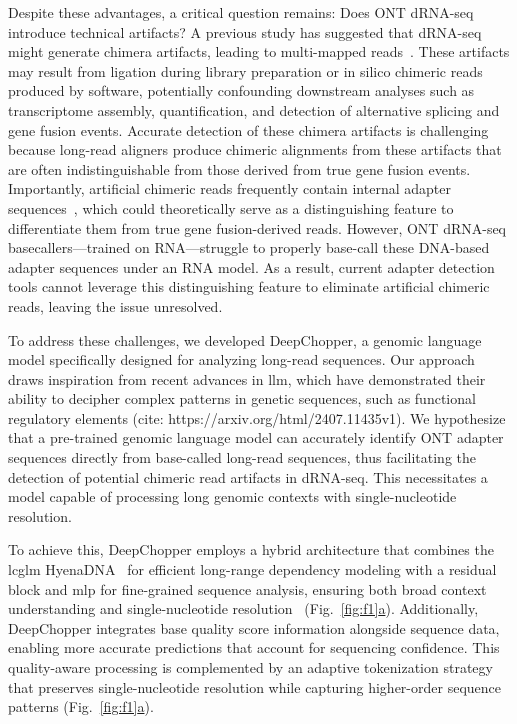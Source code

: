\documentclass[pdflatex,sn-nature, lineno]{sn-jnl}%
\newcommand{\figref}[2]{Fig.~\hyperref[#1]{\ref*{#1}#2}}
\theoremstyle{thmstyleone}%
\theoremstyle{thmstyletwo}%
\theoremstyle{thmstylethree}%
\begin{document}
Despite these advantages, a critical question remains: Does ONT dRNA-seq introduce technical artifacts? A previous study has suggested that dRNA-seq might generate chimera artifacts, leading to multi-mapped reads~\cite{smith2020molecular}. These artifacts may result from ligation during library preparation or in silico chimeric reads produced by software, potentially confounding downstream analyses such as transcriptome assembly, quantification, and detection of alternative splicing and gene fusion events. Accurate detection of these chimera artifacts is challenging because long-read aligners produce chimeric alignments from these artifacts that are often indistinguishable from those derived from true gene fusion events. Importantly, artificial chimeric reads frequently contain internal adapter sequences~\cite{smith2020molecular}, which could theoretically serve as a distinguishing feature to differentiate them from true gene fusion-derived reads. However, ONT dRNA-seq basecallers—trained on RNA—struggle to properly base-call these DNA-based adapter sequences under an RNA model. As a result, current adapter detection tools cannot leverage this distinguishing feature to eliminate artificial chimeric reads, leaving the issue unresolved.

To address these challenges, we developed DeepChopper, a genomic language model specifically designed for analyzing long-read sequences. Our approach draws inspiration from recent advances in \gls{llm}, which have demonstrated their ability to decipher complex patterns in genetic sequences, such as functional regulatory elements (cite: https://arxiv.org/html/2407.11435v1). We hypothesize that a pre-trained genomic language model can accurately identify ONT adapter sequences directly from base-called long-read sequences, thus facilitating the detection of potential chimeric read artifacts in dRNA-seq. This necessitates a model capable of processing long genomic contexts with single-nucleotide resolution.

To achieve this, DeepChopper employs a hybrid architecture that combines the \gls{lcglm} HyenaDNA~\cite{nguyen2024hyenadna} for efficient long-range dependency modeling with a residual block and \gls{mlp} for fine-grained sequence analysis, ensuring both broad context understanding and single-nucleotide resolution~\cite{poli2023hyena, he2016deep} (\figref{fig:f1}{a}). Additionally, DeepChopper integrates base quality score information alongside sequence data, enabling more accurate predictions that account for sequencing confidence. This quality-aware processing is complemented by an adaptive tokenization strategy that preserves single-nucleotide resolution while capturing higher-order sequence patterns (\figref{fig:f1}{a}).
\end{document}
